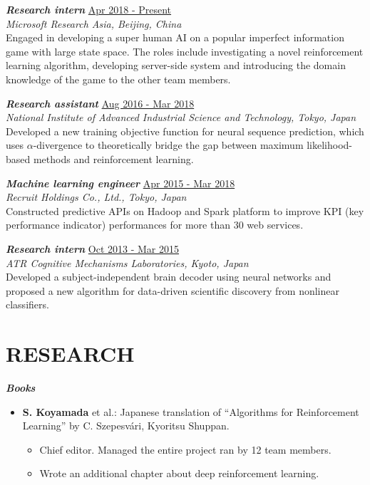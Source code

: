 \documentclass[margin, 10pt]{res} %
\begin{document}
\begin{resume}
{\sl {\bf Research intern}} \hfill {\small \underline{Apr 2018 - Present}} \\
{\it Microsoft Research Asia, Beijing, China} \\
Engaged in developing a super human AI on a popular imperfect information game with large state space. 
The roles include investigating a novel reinforcement learning algorithm, developing server-side system and introducing the domain knowledge of the game to the other team members.

{\sl {\bf Research assistant}} \hfill {\small \underline{Aug 2016 - Mar 2018}} \\
{\it National Institute of Advanced Industrial Science and Technology, Tokyo, Japan} \\
Developed a new training objective function for neural sequence prediction, which uses $\alpha$-divergence to theoretically bridge the gap between maximum likelihood-based methods and reinforcement learning.

{\sl {\bf Machine learning engineer}} \hfill {\small \underline{Apr 2015 - Mar 2018}}\\
{\it Recruit Holdings Co., Ltd., Tokyo, Japan} \\
Constructed predictive APIs on Hadoop and Spark platform to improve KPI (key performance indicator) performances for more than 30 web services.

{\sl {\bf Research intern}} \hfill {\small \underline{Oct 2013 - Mar 2015}} \\
{\it ATR Cognitive Mechanisms Laboratories, Kyoto, Japan}  \\
Developed a subject-independent brain decoder using neural networks and proposed a new algorithm for data-driven scientific discovery from nonlinear classifiers.

\section{{\small RESEARCH} }
{\sl {\bf Books}} \vspace{0.5em}
\begin{itemize}
\item {\bf S. Koyamada} et al.: Japanese translation of ``Algorithms for Reinforcement Learning'' by C. Szepesv{\'a}ri, Kyoritsu Shuppan.
  \begin{itemize}
  \item Chief editor. Managed the entire project ran by 12 team members.
  \item Wrote an additional chapter about deep reinforcement learning.
  \end{itemize}
\end{itemize}


\end{resume}
\end{document}
